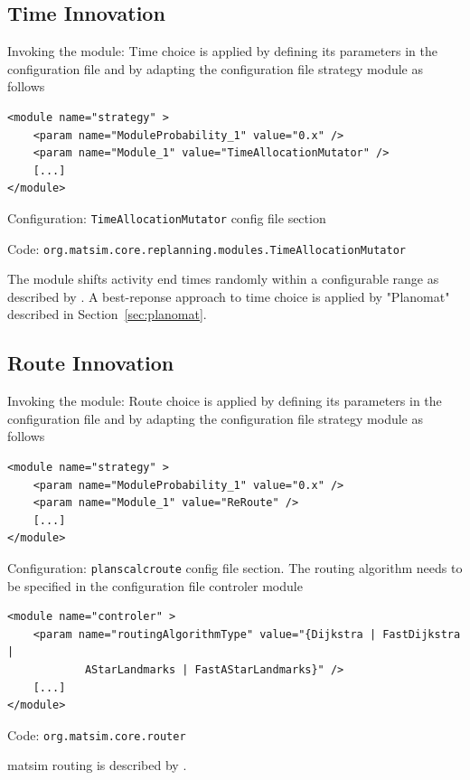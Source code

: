 
\subsection{Time Innovation}
\label{sec:timechoice}
\begin{compactitem}
\item Invoking the module: Time choice is applied by defining its parameters in the configuration file and by adapting the configuration file strategy module as follows
%
\begin{lstlisting}
<module name="strategy" >
    <param name="ModuleProbability_1" value="0.x" />
    <param name="Module_1" value="TimeAllocationMutator" />
    [...]
</module>
\end{lstlisting}
%
\item Configuration: \lstinline|TimeAllocationMutator| config file section
\item Code: \lstinline|org.matsim.core.replanning.modules.TimeAllocationMutator|
\end{compactitem}

The module shifts activity end times randomly within a configurable range as described by \citet[][]{BalmerEtAl_Timmermans_2005, Raney_PhDThesis_2005, Balmer_unpub_VSP_2004, BalmerEtAl_unpub_EIRASS_2004, BalmerEtAl_unpub_STRC_2004}. A best-reponse approach to time choice is applied by "Planomat" described in Section~\ref{sec:planomat}.

\subsection{Route Innovation}
\label{sec:routechoice}
\begin{compactitem}
\item Invoking the module: Route choice is applied by defining its parameters in the configuration file and by adapting the configuration file strategy module as follows
%
\begin{lstlisting}
<module name="strategy" >
    <param name="ModuleProbability_1" value="0.x" />
    <param name="Module_1" value="ReRoute" />
    [...]
</module>
\end{lstlisting}
%
\item Configuration: \lstinline|planscalcroute| config file section. The routing algorithm needs to be specified in the configuration file controler module
%
\begin{lstlisting}
<module name="controler" >
    <param name="routingAlgorithmType" value="{Dijkstra | FastDijkstra |
    		AStarLandmarks | FastAStarLandmarks}" />
    [...]
</module>
\end{lstlisting}
\item Code: \lstinline|org.matsim.core.router|
\end{compactitem}
%
\gls{matsim} routing is described by \citet[]{LefebvreBalmer_STRC_2007, LefebvreBalmer_TechRep_IVT_2007}. 

